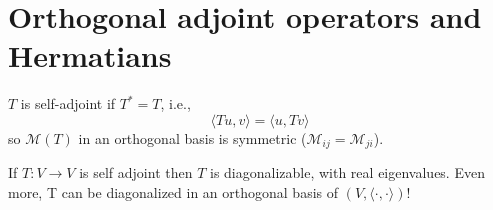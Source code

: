\documentclass{article}
\begin{document}

\section{Orthogonal adjoint operators and Hermatians}





\begin{definition}
  \( T \) is self-adjoint if \( T^* = T \), i.e., 
  \begin{displaymath}
    \langle T u , v \rangle = \langle u,Tv \rangle 
  \end{displaymath}
  so \( \mathcal{M}(T) \) in an orthogonal basis is symmetric (\( \mathcal{M}_{ij}=\mathcal{M}_{ji} \)). 
\end{definition}



\begin{theorem}  
  If \( T : V \to  V  \) is self adjoint then \( T \) is diagonalizable, with real eigenvalues. Even more, T can be diagonalized in an orthogonal basis of \( ( V, \langle \cdot , \cdot  \rangle ) \)!  

\end{theorem}
\end{document}
